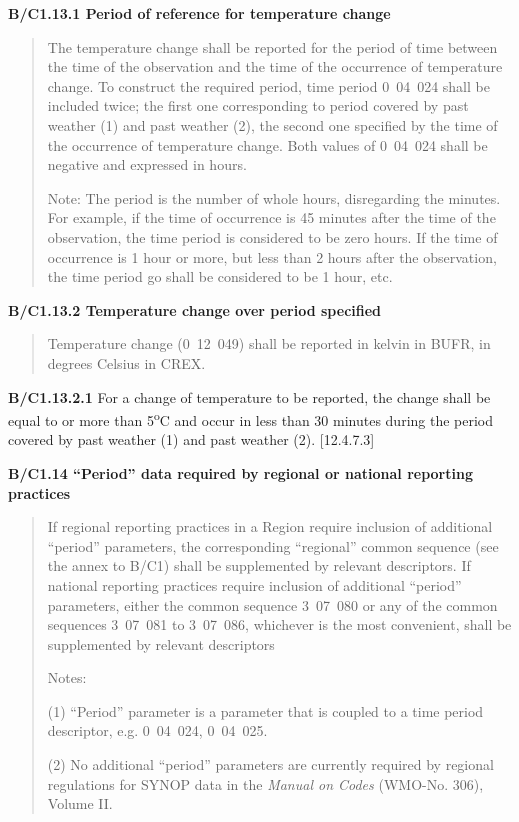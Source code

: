 \textbf{B/C1.13.1 Period of reference for temperature change}

\begin{quote}
The temperature change shall be reported for the period of time between the time of the observation and the time of the occurrence of temperature change. To construct the required period, time period 0~04~024 shall be included twice; the first one corresponding to period covered by past weather (1) and past weather (2), the second one specified by the time of the occurrence of temperature change. Both values of 0~04~024 shall be negative and expressed in hours.

Note: The period is the number of whole hours, disregarding the minutes. For example, if the time of occurrence is 45 minutes after the time of the observation, the time period is considered to be zero hours. If the time of occurrence is 1 hour or more, but less than 2 hours after the observation, the time period go shall be considered to be 1 hour, etc.
\end{quote}

\textbf{B/C1.13.2 Temperature change over period specified}

\begin{quote}
Temperature change (0~12~049) shall be reported in kelvin in BUFR, in degrees Celsius in CREX.
\end{quote}

\textbf{B/C1.13.2.1} For a change of temperature to be reported, the change shall be equal to or more than 5\textsuperscript{o}C and occur in less than 30 minutes during the period covered by past weather (1) and past weather (2). {[}12.4.7.3{]}

\textbf{B/C1.14 ``Period'' data required by regional or national reporting practices}

\begin{quote}
If regional reporting practices in a Region require inclusion of additional ``period'' parameters, the corresponding ``regional'' common sequence (see the annex to B/C1) shall be supplemented by relevant descriptors. If national reporting practices require inclusion of additional ``period'' parameters, either the common sequence 3~07~080 or any of the common sequences 3~07~081 to 3~07~086, whichever is the most convenient, shall be supplemented by relevant descriptors

Notes:

(1) ``Period'' parameter is a parameter that is coupled to a time period descriptor, e.g. 0~04~024, 0~04~025.

(2) No additional ``period'' parameters are currently required by regional regulations for SYNOP data in the \emph{Manual on Codes} (WMO-No. 306), Volume II.
\end{quote}

